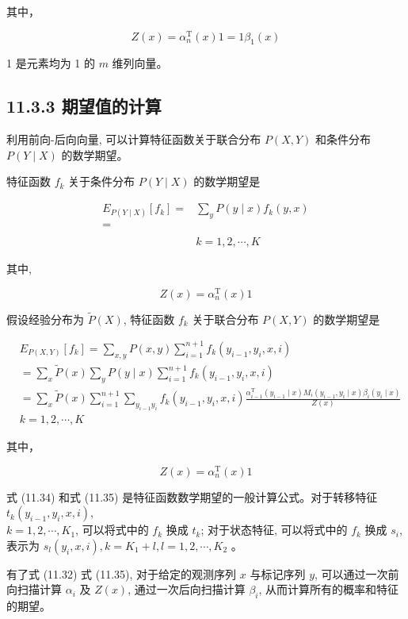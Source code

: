\documentclass[10pt]{article}
\begin{document}
\begin{CJK*}{UTF8}{bsmi}
其中，

$$
Z(x)=\alpha_{n}^{\mathrm{T}}(x) 1=1 \beta_{1}(x)
$$

1 是元素均为 1 的 $m$ 维列向量。

\subsection*{11.3.3 期望值的计算}
利用前向-后向向量, 可以计算特征函数关于联合分布 $P(X, Y)$ 和条件分布 $P(Y \mid X)$ 的数学期望。

特征函数 $f_{k}$ 关于条件分布 $P(Y \mid X)$ 的数学期望是


\begin{align*}
E_{P(Y \mid X)}\left[f_{k}\right]= & \sum_{y} P(y \mid x) f_{k}(y, x) \\
= & \\
&  \tag{11.34}\\
& k=1,2, \cdots, K
\end{align*}


其中,

$$
Z(x)=\alpha_{n}^{\mathrm{T}}(x) 1
$$

假设经验分布为 $\tilde{P}(X)$, 特征函数 $f_{k}$ 关于联合分布 $P(X, Y)$ 的数学期望是


\begin{align*}
& E_{P(X, Y)}\left[f_{k}\right]=\sum_{x, y} P(x, y) \sum_{i=1}^{n+1} f_{k}\left(y_{i-1}, y_{i}, x, i\right) \\
&=\sum_{x} \tilde{P}(x) \sum_{y} P(y \mid x) \sum_{i=1}^{n+1} f_{k}\left(y_{i-1}, y_{i}, x, i\right) \\
&=\sum_{x} \tilde{P}(x) \sum_{i=1}^{n+1} \sum_{y_{i-1} y_{i}} f_{k}\left(y_{i-1}, y_{i}, x, i\right) \frac{\alpha_{i-1}^{\mathrm{T}}\left(y_{i-1} \mid x\right) M_{i}\left(y_{i-1}, y_{i} \mid x\right) \beta_{i}\left(y_{i} \mid x\right)}{Z(x)} \\
& k=1,2, \cdots, K \tag{11.35}
\end{align*}


其中，

$$
Z(x)=\alpha_{n}^{\mathrm{T}}(x) 1
$$

式 (11.34) 和式 (11.35) 是特征函数数学期望的一般计算公式。对于转移特征 $t_{k}\left(y_{i-1}, y_{i}, x, i\right)$,\\
$k=1,2, \cdots, K_{1}$, 可以将式中的 $f_{k}$ 换成 $t_{k}$; 对于状态特征, 可以将式中的 $f_{k}$ 换成 $s_{i}$, 表示为 $s_{l}\left(y_{i}, x, i\right), k=K_{1}+l, l=1,2, \cdots, K_{2}$ 。

有了式 (11.32) 式 (11.35), 对于给定的观测序列 $x$ 与标记序列 $y$, 可以通过一次前向扫描计算 $\alpha_{i}$ 及 $Z(x)$, 通过一次后向扫描计算 $\beta_{i}$, 从而计算所有的概率和特征的期望。


\end{CJK*}
\end{document}
